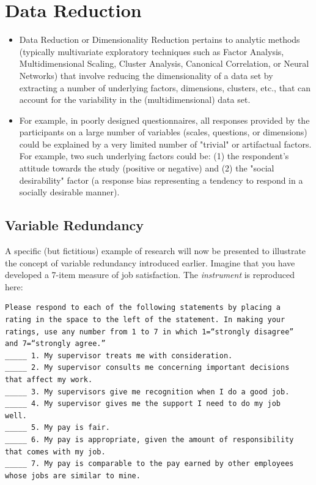 \section{Data Reduction}
\begin{itemize}
\item Data Reduction or Dimensionality Reduction pertains to analytic methods (typically multivariate exploratory techniques such as Factor Analysis, Multidimensional Scaling, Cluster Analysis, Canonical Correlation, or Neural Networks) that involve reducing the dimensionality of a data set by extracting a number of underlying factors, dimensions, clusters, etc., that can account for the variability in the (multidimensional) data set.

\item For example, in poorly designed questionnaires, all responses provided by the participants on a large number of variables (scales, questions, or dimensions) could be explained by a very limited number of "trivial" or artifactual factors. For example, two such underlying factors could be: (1) the respondent's attitude towards the study (positive or negative) and (2) the "social desirability" factor (a response bias representing a tendency to respond in a socially desirable manner).
\end{itemize}
\subsection{Variable Redundancy}
A specific (but fictitious) example of research will now be presented to illustrate the concept of
variable redundancy introduced earlier. Imagine that you have developed a 7-item measure of
job satisfaction. The \emph{instrument} is reproduced here:


\begin{framed}
\begin{verbatim}
Please respond to each of the following statements by placing a
rating in the space to the left of the statement. In making your
ratings, use any number from 1 to 7 in which 1=“strongly disagree”
and 7=“strongly agree.”
_____ 1. My supervisor treats me with consideration.
_____ 2. My supervisor consults me concerning important decisions
that affect my work.
_____ 3. My supervisors give me recognition when I do a good job.
_____ 4. My supervisor gives me the support I need to do my job
well.
_____ 5. My pay is fair.
_____ 6. My pay is appropriate, given the amount of responsibility
that comes with my job.
_____ 7. My pay is comparable to the pay earned by other employees
whose jobs are similar to mine.
\end{verbatim}
\end{framed}

